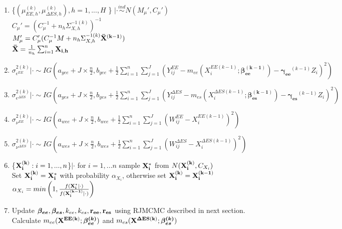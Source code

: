 \documentclass[11pt]{article}\usepackage[]{graphicx}\usepackage[]{color}
\begin{document}
\begin{enumerate}
\begin{enumerate}
\item
 \{$(\mu_{EE,h}^{(k)},\mu_{\Delta ES,h}^{(k)}), h=1,...,H$ \} $|\cdot \overset{ind}{\sim} N(M_{\mu}',C_{\mu}')$ \\
$C_{\mu}' = (C_{\mu}^{-1} + n_h \Sigma_{X,h}^{-1(k)})^{-1}$ \\
$M_{\mu}' = C_{\mu}'(C_{\mu}^{-1}M + n_h \Sigma_{X,h}^{-1(k)} {\bf \bar{X}^{(k-1)}})$ \\
${\bf \bar{X}} = \frac{1}{n_h}\sum_{i=1}^{n} {\bf X_{i,h}}$ \\

\item
 $\sigma^{2(k)}_{\epsilon^{EE}} |\cdot \sim IG(a_{yee}+J\times \frac{n}{2},b_{yee}+\frac{1}{2}\sum_{i=1}^{n}\sum_{j=1}^{J}(Y_{ij}^{EE}-m_{ee}(X_i^{EE(k-1)};\boldsymbol{\beta_{ee}^{(k-1)}})-\boldsymbol{\gamma_{ee}}^{(k-1)}Z_i)^2)$ \\
 

\item
 $\sigma^{2(k)}_{\epsilon^{\Delta ES}} |\cdot \sim IG(a_{yes}+J\times \frac{n}{2},b_{yes}+\frac{1}{2}\sum_{i=1}^{n}\sum_{j=1}^{J}(Y_{ij}^{\Delta ES}-m_{es}(X_i^{\Delta ES(k-1)};\boldsymbol{\beta_{es}^{(k-1)}})-\boldsymbol{\gamma_{es}}^{(k-1)}Z_i)^2)$ \\
 
 
\item
 $\sigma^{2(k)}_{\nu^{EE}} |\cdot \sim IG(a_{wee}+J\times \frac{n}{2},b_{wee}+\frac{1}{2}\sum_{i=1}^{n}\sum_{j=1}^{J}(W_{ij}^{EE}-X_i^{EE(k-1)})^2)$ \\
 
\item
 $\sigma^{2(k)}_{\nu^{\Delta ES}} |\cdot \sim IG(a_{wes}+J\times \frac{n}{2},b_{wes}+\frac{1}{2}\sum_{i=1}^{n}\sum_{j=1}^{J}(W_{ij}^{\Delta ES}-X_i^{\Delta ES(k-1)})^2)$ \\
 

\item
\{${\bf X_i^{(k)}}:i=1,...,n $\}$|\cdot$ for $i=1,...n$ sample ${\bf X_i^*}$ from $N({\bf X_i^{(k)}},C_{X_i})$ \\

Set ${\bf X_i^{(k)}} = {\bf X_i^*}$ with probability $\alpha_{X_i}$, otherwise set ${\bf X_i^{(k)}} = {\bf X_i^{(k-1)}}$ \\

$\alpha_{X_i} = min\left(1, \frac{f({\bf X_i^*}|\cdot)}{f({\bf X_i^{(k-1)}}|\cdot)}  \right)$ \\

\item
Update ${\boldsymbol{\beta_{ee}},\boldsymbol{\beta_{es}}},k_{ee},k_{es}, {\bf  r_{ee}, r_{es}}$ using RJMCMC described in next section. Calculate $m_{ee}({\bf X^{EE(k)}};\boldsymbol{\beta_{ee}^{(k)}})$ and $m_{es}({\bf X^{\Delta ES(k)}};\boldsymbol{\beta_{es}^{(k)}})$ \\



\end{enumerate}
\end{enumerate}
\end{document}
